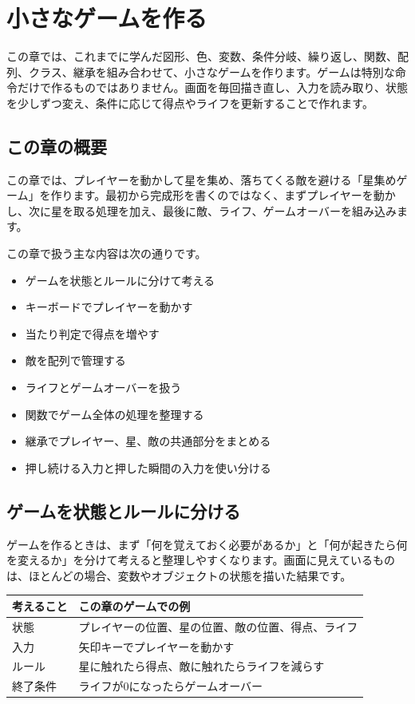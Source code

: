 \chapter{小さなゲームを作る}
\label{chap:small-game}

この章では、これまでに学んだ図形、色、変数、条件分岐、繰り返し、関数、配列、クラス、継承を組み合わせて、小さなゲームを作ります。ゲームは特別な命令だけで作るものではありません。画面を毎回描き直し、入力を読み取り、状態を少しずつ変え、条件に応じて得点やライフを更新することで作れます。

\section{この章の概要}

この章では、プレイヤーを動かして星を集め、落ちてくる敵を避ける「星集めゲーム」を作ります。最初から完成形を書くのではなく、まずプレイヤーを動かし、次に星を取る処理を加え、最後に敵、ライフ、ゲームオーバーを組み込みます。

この章で扱う主な内容は次の通りです。

\begin{itemize}
    \item ゲームを状態とルールに分けて考える
    \item キーボードでプレイヤーを動かす
    \item 当たり判定で得点を増やす
    \item 敵を配列で管理する
    \item ライフとゲームオーバーを扱う
    \item 関数でゲーム全体の処理を整理する
    \item 継承でプレイヤー、星、敵の共通部分をまとめる
    \item 押し続ける入力と押した瞬間の入力を使い分ける
\end{itemize}

\section{ゲームを状態とルールに分ける}

ゲームを作るときは、まず「何を覚えておく必要があるか」と「何が起きたら何を変えるか」を分けて考えると整理しやすくなります。画面に見えているものは、ほとんどの場合、変数やオブジェクトの状態を描いた結果です。

\begin{center}
\begin{tabular}{ll}
\toprule
考えること & この章のゲームでの例 \\
\midrule
状態 & プレイヤーの位置、星の位置、敵の位置、得点、ライフ \\
入力 & 矢印キーでプレイヤーを動かす \\
ルール & 星に触れたら得点、敵に触れたらライフを減らす \\
終了条件 & ライフが0になったらゲームオーバー \\
\bottomrule
\end{tabular}
\end{center}

